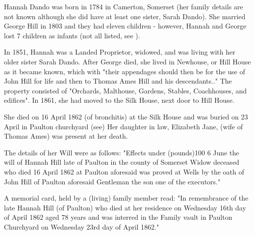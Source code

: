 
   
Hannah Dando was born in 1784 in Camerton, Somerset (her family details are not known although she did have at least one sister, Sarah Dando).  She married George Hill in 1803 and they had eleven children - however, Hannah and George lost 7 children as infants (not all listed, see ). 

In 1851, Hannah was a Landed Proprietor, widowed, and was living with her older sister Sarah Dando.\cite{HDandoHome} After George died, she lived in Newhouse, or Hill House as it became known, which with "their appendages should then be for the use of John Hill for life and then to Thomas Ames Hill and his descendants.." The property consisted of "Orchards, Malthouse, Gardens, Stables, Coachhouses, and edifices". In 1861, she had moved to the Silk House, next door to Hill House.\cite{HDando1861}

She died on 16 April 1862 (of bronchitis) at the Silk House and was buried on 23 April in Paulton churchyard (see) Her daughter in law, Elizabeth Jane, (wife of Thomas Ames) was present at her death.  

The details of her Will were as follows: 
"Effects under (pounds)100 6 June the will of Hannah Hill late of Paulton in the county of Somerset Widow deceased who died 16 April 1862 at Paulton aforesaid was proved at Wells by the oath of John Hill of Paulton aforesaid Gentleman the son one of the executors."

A memorial card, held by a (living) family member read:
"In remembrance of the late Hannah Hill (of Paulton) who died at her residence on Wednesday 16th day of April 1862 aged 78 years and was interred in the Family vault in Paulton Churchyard on Wednesday 23rd day of April 1862." 
